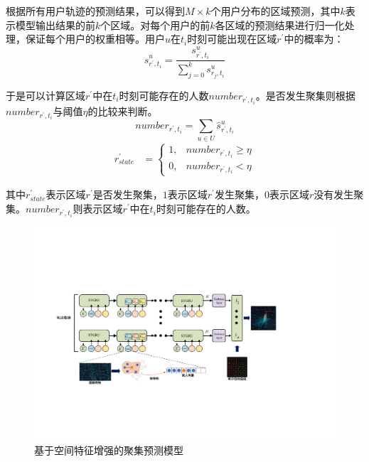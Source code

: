 \documentclass[master]{thesis-uestc}
\begin{document}
根据所有用户轨迹的预测结果，可以得到$M\times k$个用户分布的区域预测，其中$k$表示模型输出结果的前$k$个区域。对每个用户的前$k$各区域的预测结果进行归一化处理，保证每个用户的权重相等。用户$u$在$t_i$时刻可能出现在区域$r^{\prime}$中的概率为：
\begin{equation}
   \hat{s}^u_{r^{\prime},t_i} = \frac{s^u_{r^{\prime},t_i}}{\sum\limits_{j=0}^{k} s^u_{r_j,t_i}}
\end{equation}

于是可以计算区域$r^{\prime}$中在$t_i$时刻可能存在的人数$number_{r^{\prime},t_i}$。是否发生聚集则根据$number_{r^{\prime},t_i}$与阈值$\eta$的比较来判断。
\begin{equation}
   number_{r^{\prime},t_i} = \sum_{u\in U} \hat{s}^u_{r^{\prime},t_i}
\end{equation}
\begin{align}
    r^{\prime}_{state} &= 
        \begin{cases}
        1,& number_{r^{\prime},t_i}\ge \eta 
        \\
        0,& number_{r^{\prime},t_i}< \eta
        \end{cases}
\end{align}

其中$r^{\prime}_{state}$表示区域$r^{\prime}$是否发生聚集，$1$表示区域$r^{\prime}$发生聚集，$0$表示区域$r$没有发生聚集。$number_{r^{\prime},t_i}$则表示区域$r^{\prime}$中在$t_i$时刻可能存在的人数。

\begin{figure}[!ht]
\centering
\includegraphics[width=1.0\linewidth]{./pic/stgru_all_3.pdf}
\caption{基于空间特征增强的聚集预测模型}
\label{Figure.4.0.1}
\end{figure}
\end{document}
